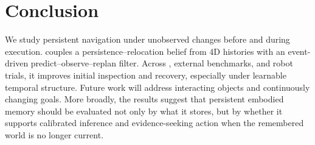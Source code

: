\section{Conclusion}

We study persistent navigation under unobserved changes before and during
execution. \evolvingworldnav{} couples a persistence--relocation belief from 4D
histories with an event-driven predict--observe--replan filter. Across
\evolvingworldbench{}, external benchmarks, and robot trials, it improves initial
inspection and recovery, especially under learnable temporal structure. Future
work will address interacting objects and continuously changing goals. More
broadly, the results suggest that persistent embodied memory should be evaluated
not only by what it stores, but by whether it supports calibrated inference and
evidence-seeking action when the remembered world is no longer current.